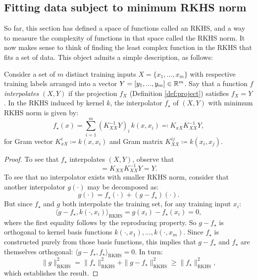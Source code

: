 \begin{refsection}
\subsection{Fitting data subject to minimum RKHS norm}

So far, this section has defined a space of functions called an RKHS, and a way to measure the complexity of functions in that space called the RKHS norm. It now makes sense to think of finding the least complex function in the RKHS that fits a set of data. This object admits a simple description, as follows:

\begin{theorem}\label{thm:min-rkhs} Consider a set of $m$ distinct training inputs $X=\{x_1,...,x_m\}$ with respective training labels arranged into a vector $Y=[y_1,...,y_m]\in\mathbb{R}^m$. Say that a function $f$ \textit{interpolates} $(X,Y)$ if the projection $f_X$ (Definition \ref{def:project}) satisfies $f_X = Y$. In the RKHS induced by kernel $k$, the interpolator $f_\star$ of $(X,Y)$ with minimum RKHS norm is given by:
\begin{equation}\label{eq:min-rkhs-interpolator}
    f_\star(x) = \sum_{i=1}^m (K_{XX}^{-1} Y)_i\,k(x,x_i) \eqqcolon K_{xX} K_{XX}^{-1} Y,
\end{equation}
for Gram vector $K_{xX}^{i}\coloneqq k(x,x_i)$ and Gram matrix $K_{XX}^{ij}\coloneqq k(x_i,x_j)$.
\end{theorem}
\begin{proof}To see that $f_\star$ interpolates $(X,Y)$, observe that
\begin{equation*}
    [f_\star(x_1), ..., f_\star(x_m)] = K_{XX} K_{XX}^{-1} Y = Y.
\end{equation*}
To see that no interpolator exists with smaller RKHS norm, consider that another interpolator $g(\cdot)$ may be decomposed as:
\begin{equation*}
    g(\cdot) = f_\star(\cdot) + (g-f_\star)(\cdot).
\end{equation*}
But since $f_\star$ and $g$ both interpolate the training set, for any training input $x_i$:
\begin{equation*}
    \langle g-f_\star, k(\cdot,x_i) \rangle_\mathrm{RKHS}= g(x_i) - f_\star(x_i) =0,
\end{equation*}
where the first equality follows by the reproducing property. So $g-f_\star$ is orthogonal to kernel basis functions $k(\cdot,x_1),...,k(\cdot,x_m)$. Since $f_\star$ is constructed purely from those basis functions, this implies that $g-f_\star$ and $f_\star$ are themselves orthogonal: $\langle g-f_\star,f_\star\rangle_\mathrm{RKHS} = 0$. In turn:
\begin{equation}\label{eq:orthog-functions}
    \|g\|_\mathrm{RKHS}^2 = \|f_\star\|_\mathrm{RKHS}^2 + \|g-f_\star\|_\mathrm{RKHS}^2 \geq \|f_\star\|_\mathrm{RKHS}^2,
\end{equation}
which establishes the result.
\end{proof}


\end{refsection}
